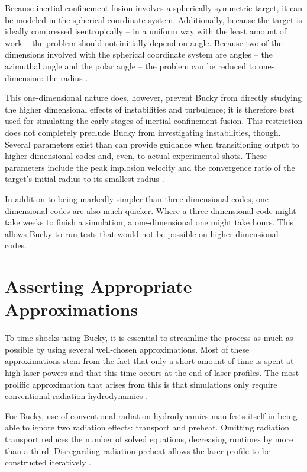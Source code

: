 \pagebreak

Because inertial confinement fusion involves a spherically symmetric target, it can be modeled in the spherical coordinate system.  Additionally, because the target is ideally compressed isentropically -- in a uniform way with the least amount of work -- the problem should not initially depend on angle. Because two of the dimensions involved with the spherical coordinate system are angles -- the azimuthal angle and the polar angle -- the problem can be reduced to one-dimension: the radius \citep{mosesBook}.  

This one-dimensional nature does, however, prevent Bucky from directly studying the higher dimensional effects of instabilities and turbulence; it is therefore best used for simulating the early stages of inertial confinement fusion.  This restriction does not completely preclude Bucky from investigating instabilities, though.  Several parameters exist than can provide guidance when transitioning output to higher dimensional codes and, even, to actual experimental shots. These parameters include the peak implosion velocity and the convergence ratio of the target's initial radius to its smallest radius \citep{perkinsPaper}.

In addition to being markedly simpler than three-dimensional codes, one-dimensional codes are also much quicker.  Where a three-dimensional code might take weeks to finish a simulation, a one-dimensional one might take hours.  This allows Bucky to run tests that would not be possible on higher dimensional codes.  

\section{Asserting Appropriate Approximations}

To time shocks using Bucky, it is essential to streamline the process as much as possible by using several well-chosen approximations.  Most of these approximations stem from the fact that only a short amount of time is spent at high laser powers and that this time occurs at the end of laser profiles.  The most prolific approximation that arises from this is that simulations only require conventional radiation-hydrodynamics \citep{perkinsPaper}.

For Bucky, use of conventional radiation-hydrodynamics manifests itself in being able to ignore two radiation effects: transport and preheat. Omitting radiation transport reduces the number of solved equations, decreasing runtimes by more than a third. Disregarding radiation preheat allows the laser profile to be constructed iteratively \citep{terryThesis}.

